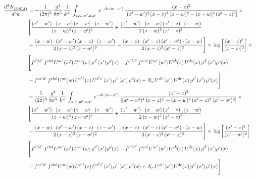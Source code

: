 \documentclass[9pt]{article}
\numberwithin{equation}{section}
\begin{document}
\begin{align}
    \frac{d^{3}N_{2b\,\rm NLO}^{\rm}}{d^{3}k}  & =   - \frac{1}{(2\pi)^{3}}\, \frac{g^{4}}{8\pi^{5}}\,\frac{1}{k^{+}}\,\int_{z,w,w^{\prime},x,x'}\, e^{-ik\cdot (w-w')}\, \frac{(x-z)^{2}}{\left[(x'-w')^{2}\,(x-z)^{2}\,(x-w)^{2} - (x-w)^{4}\, (x'-z)^{2}\right]}\,  \times\notag \\ & \Bigg[\frac{(x'-w')\cdot (x-w)\, (z-w)\cdot (z-w')}{(z-w)^{2}\, (z-w')^{2}}+\frac{(x'-w')\cdot (x-w)\, (x'-z)\cdot (z-w)}{2\, (z-w)^{2}\, (x'-z)^{2}}\notag \\ & +\frac{(x-w)\cdot (x'-w')\, (x-z)\cdot (z-w')}{2\, (x-z)^{2}\, (z-w')^{2}}+\frac{(x-z)\cdot (x'-z)\, (x'-w')\cdot (x-w)}{4\, (x-z)^{2}\, (x'-z)^{2}}\Bigg] \times\,\log{\left[\frac{(x-z)^{2}}{(x-w)^{2}}\right]}\,\times \notag \\ & \Bigg[f^{c'bd'}\,f^{cbd}\, U^{ac'}(w')\,U^{ac}(w)\,\rho^{d'}(x')\rho^{d}(x)- f^{c'bd'}\,f^{acd}\,U^{ac'}(w')\,U^{cb}(z)\,U^{de}(x)\,\rho^{d'}(x')\rho^{e}(x) \notag \\ & -f^{ac'd'}\,f^{cbd}\,U^{ac}(w)\,U^{c'b}(z)\,U^{d'e'}(x')\,\rho^{e'}(x')\,\rho^{d}(x) +N_{c}\,U^{de'}(x')\,U^{de}(x)\,\rho^{e'}(x')\,\rho^{e}(x)\Bigg] \notag \\
&  + \frac{1}{(2\pi)^{3}}\, \frac{g^{4}}{8\pi^{5}}\,\frac{1}{k^{+}}\,\int_{z,w,w^{\prime},x,x'}\, e^{-ik\cdot (w-w')}\, \frac{(x'-z)^{2}}{\left[(x'-w')^{4}\,(x-z)^{2}\, - (x-w)^{2}\, (x'-z)^{2}\,(x'-w')^{2}\right]}\,  \times\notag \\ & \Bigg[\frac{(x'-w')\cdot (x-w)\, (z-w)\cdot (z-w')}{(z-w)^{2}\, (z-w')^{2}}+\frac{(x'-w')\cdot (x-w)\, (x'-z)\cdot (z-w)}{2\, (z-w)^{2}\, (x'-z)^{2}}\notag \\ & +\frac{(x-w)\cdot (x'-w')\, (x-z)\cdot (z-w')}{2\, (x-z)^{2}\, (z-w')^{2}}+\frac{(x-z)\cdot (x'-z)\, (x'-w')\cdot (x-w)}{4\, (x-z)^{2}\, (x'-z)^{2}}\Bigg] \times\,\log{\left[\frac{(x'-z)^{2}}{(x'-w')^{2}}\right]} \notag \\ & \Bigg[f^{c'bd'}\,f^{cbd}\, U^{ac'}(w')\,U^{ac}(w)\,\rho^{d'}(x')\rho^{d}(x)- f^{c'bd'}\,f^{acd}\,U^{ac'}(w')\,U^{cb}(z)\,U^{de}(x)\,\rho^{d'}(x')\rho^{e}(x) \notag \\ & -f^{ac'd'}\,f^{cbd}\,U^{ac}(w)\,U^{c'b}(z)\,U^{d'e'}(x')\,\rho^{e'}(x')\,\rho^{d}(x) +N_{c}\,U^{de'}(x')\,U^{de}(x)\,\rho^{e'}(x')\,\rho^{e}(x)\Bigg]
\end{align}
\end{document}

